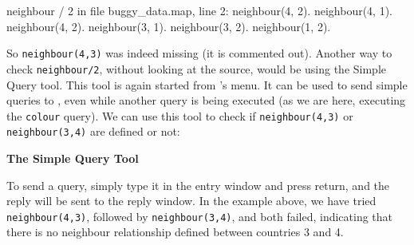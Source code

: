\begin{code}
neighbour / 2 in file buggy_data.map, line 2:
neighbour(4, 2).
neighbour(4, 1).
neighbour(4, 2).
neighbour(3, 1).
neighbour(3, 2).
neighbour(1, 2).
\end{code}


So \verb'neighbour(4,3)' was indeed missing (it is commented out).
Another way to check \verb'neighbour/2', without looking at the source,
would be using the
Simple Query tool. This tool is again started from {\tkeclipse}'s
 menu. It can be used to send simple queries to {\eclipse},
even while another query is being executed (as we are here, executing the
\verb'colour' query). We can use this tool to check if \verb'neighbour(4,3)'
or \verb'neighbour(3,4)' are defined or not:

\begin{center}

\vspace{3mm}
{\bf The Simple Query Tool}
\end{center}

To send a query, simply type it in the entry window and press return, and
the reply will be sent to the reply window. In the example above, we have
tried \verb'neighbour(4,3)', followed by \verb'neighbour(3,4)', and
both failed, indicating that there is no neighbour relationship defined
between countries 3 and 4.

